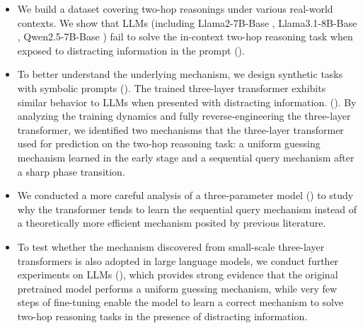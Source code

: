 \begin{itemize}
    \item We build a dataset covering two-hop reasonings under various real-world contexts.     
    We show that LLMs (including Llama2-7B-Base \citep{touvron2023llama}, Llama3.1-8B-Base \citep{dubey2024llama}, Qwen2.5-7B-Base \citep{yang2024qwen2}) fail to solve the in-context two-hop reasoning task when exposed to distracting information in the prompt ().
    \item To better understand the underlying mechanism, we design synthetic tasks with symbolic prompts (). The trained three-layer transformer exhibits similar behavior to LLMs when presented with distracting information.  (). 
    By analyzing the training dynamics and fully reverse-engineering the three-layer transformer, we identified two mechanisms that the three-layer transformer used for prediction on the two-hop reasoning task: a uniform guessing mechanism learned in the early stage and a sequential query mechanism after a sharp phase transition.  
    \item We conducted a more careful analysis of a three-parameter model () to study why the transformer tends to learn the sequential query mechanism instead of a theoretically more efficient mechanism posited by previous literature.  
    \item To test whether the mechanism discovered from small-scale three-layer transformers is also adopted in large language models, we conduct further experiments on LLMs (), which provides strong evidence that the original pretrained model performs a uniform guessing mechanism, while very few steps of fine-tuning enable the model to learn a correct mechanism to solve two-hop reasoning tasks in the presence of distracting information.  
\end{itemize}


